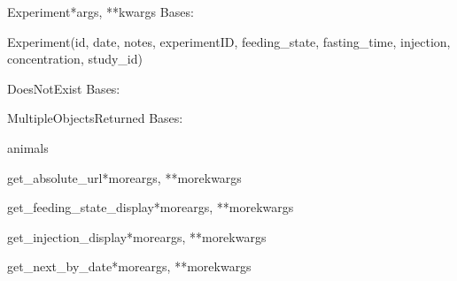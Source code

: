 \documentclass[letterpaper,10pt,english]{sphinxmanual}
\begin{document}
\hypertarget{data.models.Experiment}{}\begin{classdesc}{Experiment}{*args, **kwargs}
Bases: 

Experiment(id, date, notes, experimentID, feeding\_state, fasting\_time, injection, concentration, study\_id)

\hypertarget{data.models.Experiment.DoesNotExist}{}\begin{excdesc}{DoesNotExist}
Bases: 
\end{excdesc}

\hypertarget{data.models.Experiment.MultipleObjectsReturned}{}\begin{excdesc}{MultipleObjectsReturned}
Bases: 
\end{excdesc}

\hypertarget{data.models.Experiment.animals}{}\begin{memberdesc}[Experiment]{animals}\end{memberdesc}

\hypertarget{data.models.Experiment.get\_absolute\_url}{}\begin{methoddesc}[Experiment]{get\_absolute\_url}{*moreargs, **morekwargs}\end{methoddesc}

\hypertarget{data.models.Experiment.get\_feeding\_state\_display}{}\begin{methoddesc}[Experiment]{get\_feeding\_state\_display}{*moreargs, **morekwargs}\end{methoddesc}

\hypertarget{data.models.Experiment.get\_injection\_display}{}\begin{methoddesc}[Experiment]{get\_injection\_display}{*moreargs, **morekwargs}\end{methoddesc}

\hypertarget{data.models.Experiment.get\_next\_by\_date}{}\begin{methoddesc}[Experiment]{get\_next\_by\_date}{*moreargs, **morekwargs}\end{methoddesc}


\end{classdesc}
\end{document}
